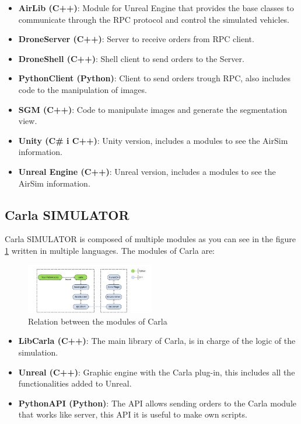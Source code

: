 \documentclass[10pt,a4paper,twocolumn,twoside]{article}
\begin{document}
\begin{itemize}
	\item \textbf{AirLib (C++)}: Module for Unreal Engine that provides the base classes to communicate through the RPC protocol and control the simulated vehicles.
	\item \textbf{DroneServer (C++)}: Server to receive orders from RPC client.
  	\item \textbf{DroneShell (C++)}: Shell client to send orders to the Server.
  	\item \textbf{PythonClient (Python)}: Client to send orders trough RPC, also includes code to the manipulation of images.
  	\item \textbf{SGM (C++)}: Code to manipulate images and generate the segmentation view.
    \item \textbf{Unity (C\# i C++)}: Unity version, includes a modules to see the AirSim information.
    \item \textbf{Unreal Engine (C++)}: Unreal version, includes a modules to see the AirSim information.
\end{itemize}

\subsection{Carla SIMULATOR}

Carla SIMULATOR is composed of multiple modules as you can see in the figure \ref{fig-carlamodules} written in multiple languages. The modules of Carla are:

\begin{figure}[!h]
\centering
  	\includegraphics[width=0.5\textwidth]{carlamodules}
	\caption{Relation between the modules of Carla}
	\label{fig-carlamodules}
\end{figure}

\begin{itemize}
 \item \textbf{LibCarla (C++)}: The main library of Carla, is in charge of the logic of the simulation.
 \item \textbf{Unreal (C++)}: Graphic engine with the Carla plug-in, this includes all the functionalities added to Unreal.
 \item \textbf{PythonAPI (Python)}: The API allows sending orders to the Carla module that works like server, this API it is useful to make own scripts.
\end{itemize}
\end{document}
